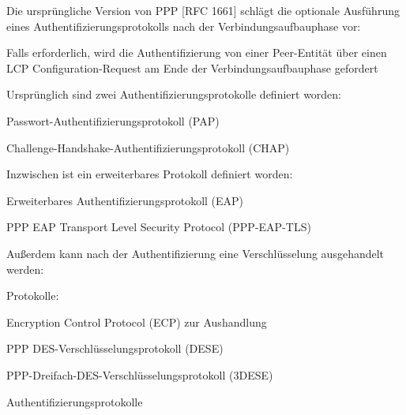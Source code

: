 \documentclass[a4paper]{article}
\begin{document}
\begin{multicols}{3}
      \begin{itemize*}
            \item Die ursprüngliche Version von PPP {[}RFC 1661{]} schlägt die optionale
            Ausführung eines Authentifizierungsprotokolls nach der
            Verbindungsaufbauphase vor:
            \begin{itemize*}
                  \item Falls erforderlich, wird die Authentifizierung von einer Peer-Entität über einen LCP Configuration-Request am Ende der Verbindungsaufbauphase gefordert
                  \item Ursprünglich sind zwei Authentifizierungsprotokolle definiert worden:
                  \begin{itemize*} \item Passwort-Authentifizierungsprotokoll (PAP) \item Challenge-Handshake-Authentifizierungsprotokoll (CHAP) \end{itemize*}
                  \item Inzwischen ist ein erweiterbares Protokoll definiert worden:
                  \begin{itemize*} \item Erweiterbares Authentifizierungsprotokoll (EAP) \item PPP EAP Transport Level Security Protocol (PPP-EAP-TLS) \end{itemize*}
            \end{itemize*}
            \item Außerdem kann nach der Authentifizierung eine Verschlüsselung
            ausgehandelt werden:
            \begin{itemize*}
                  \item Protokolle:
                  \begin{itemize*} \item Encryption Control Protocol (ECP) zur Aushandlung \item PPP DES-Verschlüsselungsprotokoll (DESE) \item PPP-Dreifach-DES-Verschlüsselungsprotokoll (3DESE) \end{itemize*}
            \end{itemize*}
      \end{itemize*}

      Authentifizierungsprotokolle


\end{multicols}
\end{document}
